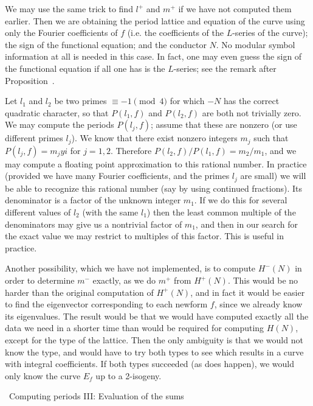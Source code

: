  \endsubhead
We may use the same trick to find $l^+$ and $m^+$ if we have not
computed them earlier.  Then we are obtaining the period lattice and
equation of the curve using only the Fourier coefficients of $f$ (i.e.
the coefficients of the $L$-series of the curve); the sign of the
functional equation; and the conductor $N$.  No modular symbol
information at all is needed in this case.  In fact, one may even
guess the sign of the functional equation if all one has is the
$L$-series; see the remark after Proposition~\LfoneProp.

 \endsubhead
Let $l_1$ and $l_2$ be two primes ${}\equiv-1\pmod4$ for which $-N$
has the correct quadratic character, so that $P(l_1,f)$ and $P(l_2,f)$
are both not trivially zero.  We may compute the periods $P(l_j,f)$;
assume that these are nonzero (or use different primes $l_j$).  We
know that there exist nonzero integers $m_j$ such that
$P(l_j,f)=m_jyi$ for $j=1,2$.  Therefore $P(l_2,f)/P(l_1,f)=m_2/m_1$,
and we may compute a floating point approximation to this rational
number.  In practice (provided we have many Fourier coefficients, and
the primes $l_j$ are small) we will be able to recognize this rational
number (say by using continued fractions).  Its denominator is a
factor of the unknown integer $m_1$.  If we do this for several
different values of $l_2$ (with the same $l_1$) then the least common
multiple of the denominators may give us a nontrivial factor of $m_1$,
and then in our search for the exact value we may restrict to
multiples of this factor.  This is useful in practice.

 \endsubhead
Another possibility, which we have not implemented, is to compute
$H^-(N)$ in order to determine $m^-$ exactly, as we do $m^+$ from
$H^+(N)$.  This would be no harder than the original computation of
$H^+(N)$, and in fact it would be easier to find the eigenvector
corresponding to each newform $f$, since we already know its
eigenvalues.  The result would be that we would have computed exactly
all the data we need in a shorter time than would be required for
computing $H(N)$, except for the type of the lattice.  Then the only
ambiguity is that we would not know the type, and would have to try
both types to see which results in a curve with integral coefficients.
If both types succeeded (as does happen), we would only know the curve
$E_f$ up to a 2-isogeny.

%
%

\beginsection{\PerIII}
\head \PerIII\ Computing periods III: Evaluation of the sums \endhead

